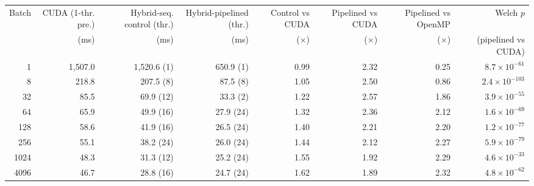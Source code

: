 \begin{tabular}{rrrrrrrr}
\toprule
Batch & CUDA (1-thr. pre.) & Hybrid-seq. control (thr.) & Hybrid-pipelined (thr.) & Control vs CUDA & Pipelined vs CUDA & Pipelined vs OpenMP & Welch $p$ \\
 & (ms) & (ms) & (ms) & ($\times$) & ($\times$) & ($\times$) & (pipelined vs CUDA) \\
\midrule
1 & 1{,}507.0 & 1{,}520.6 (1) & 650.9 (1) & 0.99 & 2.32 & 0.25 & $8.7\times10^{-61}$ \\
8 & 218.8 & 207.5 (8) & 87.5 (8) & 1.05 & 2.50 & 0.86 & $2.4\times10^{-103}$ \\
32 & 85.5 & 69.9 (12) & 33.3 (2) & 1.22 & 2.57 & 1.86 & $3.9\times10^{-55}$ \\
64 & 65.9 & 49.9 (16) & 27.9 (24) & 1.32 & 2.36 & 2.12 & $1.6\times10^{-69}$ \\
128 & 58.6 & 41.9 (16) & 26.5 (24) & 1.40 & 2.21 & 2.20 & $1.2\times10^{-77}$ \\
256 & 55.1 & 38.2 (24) & 26.0 (24) & 1.44 & 2.12 & 2.27 & $5.9\times10^{-79}$ \\
1024 & 48.3 & 31.3 (12) & 25.2 (24) & 1.55 & 1.92 & 2.29 & $4.6\times10^{-33}$ \\
4096 & 46.7 & 28.8 (16) & 24.7 (24) & 1.62 & 1.89 & 2.32 & $4.8\times10^{-62}$ \\
\bottomrule
\end{tabular}
